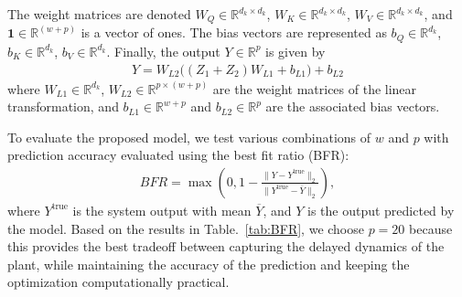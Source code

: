 \documentclass{ifacconf}
\begin{document}
The weight matrices are denoted  \(W_{Q} \in \mathbb{R}^{d_k \times d_k}\), \(W_{K} \in \mathbb{R}^{d_k \times d_k}\), \(W_{V} \in \mathbb{R}^{d_k \times d_k}\), and $\mathbf{1} \in \mathbb{R}^{(w+p)}$ is a vector of ones. The bias vectors are represented as \(b_{Q} \in \mathbb{R}^{d_k}\), \(b_{K} \in \mathbb{R}^{d_k}\), \(b_{V} \in \mathbb{R}^{d_k}\). Finally, the output \(Y \in \mathbb{R}^{p}\) is given by 
\begin{equation}
\label{fun:Y}
  \begin{aligned}
    Y = W_{L2} \bigl((Z_1 + Z_2 )W_{L1} + b_{L1}\bigr) + b_{L2}
  \end{aligned}
\end{equation}
where \(W_{L1} \in \mathbb{R}^{d_k}\), \(W_{L2} \in \mathbb{R}^{p \times (w+p)}\) are the weight matrices of the linear transformation, and \(b_{L1} \in \mathbb{R}^{w+p}\) and \(b_{L2} \in \mathbb{R}^{p}\) are the associated bias vectors.

To evaluate the proposed model, we test various combinations of \(w\) and \(p\) with prediction accuracy \citep{MASTI2021109666} evaluated using the best fit ratio (BFR):
\begin{equation}
\label{fun:BFR}
  \begin{aligned}
    \mathit{BFR} = \max(0,1-\frac{\lVert Y-Y^{\mathrm{true}} \rVert_2}{\lVert Y^{\mathrm{true}} - \overline{Y} \rVert_2}) ,
  \end{aligned}
\end{equation}
where \(Y^{\mathrm{true}}\) is the system output with mean \(\overline{Y}\), and \(Y\) is the output predicted by the model. Based on the results in Table.~\ref{tab:BFR}, we choose $p=20$ because this provides the best tradeoff between capturing the delayed dynamics of the plant, while maintaining the accuracy of the prediction and keeping the optimization computationally practical.

\end{document}
